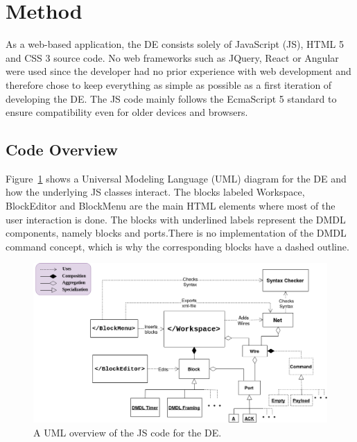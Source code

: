 \documentclass[journal,comsoc]{IEEEtran}
\begin{document}
\section{Method}
As a web-based application, the DE consists solely of JavaScript (JS), HTML 5 and CSS 3 source
code. No web frameworks such as JQuery, React or Angular were used since the developer had no
prior experience with web development and therefore chose to keep everything as simple as possible
as a first iteration of developing the DE. The JS code mainly follows the EcmaScript 5 standard to
ensure compatibility even for older devices and browsers.

\subsection{Code Overview}
Figure~\ref{fig:uml} shows a Universal Modeling Language (UML) diagram for the DE and how the
underlying JS classes interact. The blocks labeled Workspace, BlockEditor and BlockMenu are the
main HTML elements where most of the user interaction is done. The blocks with underlined labels
represent the DMDL components, namely blocks and ports.There is no implementation of the DMDL
command concept, which is why the corresponding blocks have a dashed outline.
\begin{figure}[!t]
\centering
\includegraphics[width=\columnwidth]{dmdl-editor.png}
\caption{A UML overview of the JS code for the DE.}
\label{fig:uml}
\end{figure}
\end{document}
